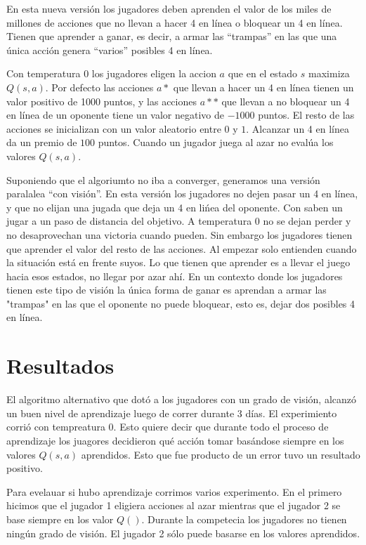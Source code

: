 \documentclass[11pt, spanish]{article}
\begin{document}
\par En esta nueva versi\'on los jugadores deben aprenden el valor de los miles de millones de acciones que no llevan a hacer 4 en l\'inea o bloquear un 4 en l\'inea. Tienen que aprender a ganar, es decir, a armar las ``trampas'' en las que una \'unica acci\'on genera ``varios'' posibles 4 en línea. 

\par Con temperatura 0 los jugadores eligen la accion $a$ que en el estado $s$ maximiza $Q(s,a)$. Por defecto las acciones $a*$ que llevan a hacer un 4 en l\'inea tienen un valor positivo de 1000 puntos, y las acciones $a**$ que llevan a no bloquear un 4 en l\'inea de un oponente tiene un valor negativo de $-1000$ puntos. El resto de las acciones se inicializan con un valor aleatorio entre $0$ y $1$. Alcanzar un 4 en l\'inea da un premio de $100$ puntos. Cuando un jugador juega al azar no eval\'ua los valores $Q(s,a)$. 


Suponiendo que el algoriumto no iba a converger, generamos una versi\'on paralalea ``con visi\'on''. En esta versi\'on los jugadores no dejen pasar un 4 en l\'inea, y que no elijan una jugada que deja un 4 en li\'nea del oponente. Con saben un jugar a un paso de distancia del objetivo. A temperatura 0 no se dejan perder y no desaprovechan una victoria cuando pueden. Sin embargo los jugadores tienen que aprender el valor del resto de las acciones. Al empezar solo entienden cuando la situación está en frente suyos. Lo que tienen que aprender es a llevar el juego hacia esos estados, no llegar por azar ahí. En un contexto donde los jugadores tienen este tipo de visi\'on la \'unica forma de ganar es aprendan a armar las "trampas" en las que el oponente no puede bloquear, esto es, dejar dos posibles 4 en línea.


\section{Resultados}

\par El algoritmo alternativo que dot\'o a los jugadores con un grado de visi\'on, alcanz\'o un buen nivel de aprendizaje luego de correr durante 3 d\'ias. El experimiento corri\'o con tempreatura 0. Esto quiere decir que durante todo el proceso de aprendizaje los juagores decidieron qu\'e acci\'on tomar bas\'andose siempre en los valores $Q(s,a)$ aprendidos. Esto que fue producto de un error tuvo un resultado positivo. 

\par Para evelauar si hubo aprendizaje corrimos varios experimento. En el primero hicimos que el jugador 1 eligiera acciones al azar mientras que el jugador 2 se base siempre en los valor $Q()$. Durante la competecia los jugadores no tienen ning\'un grado de visi\'on. El jugador 2 s\'olo puede basarse en los valores aprendidos. 
\end{document}

